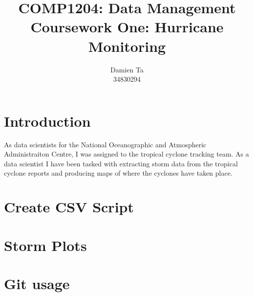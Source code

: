 \documentclass[]{article}
\title{COMP1204: Data Management \\ Coursework One: Hurricane Monitoring }
\author{Damien Ta \\ 34830294}
\begin{document}
\maketitle

\section{Introduction}
As data scientists for the National Oceanographic and Atmospheric Administraiton Centre, I was assigned to the tropical cyclone
tracking team. As a data scientist I have been tasked with extracting storm data from the tropical cyclone reports and producing
maps of where the cyclones have taken place.
\section{Create CSV Script}

\section{Storm Plots}

\section{Git usage}
\end{document}
